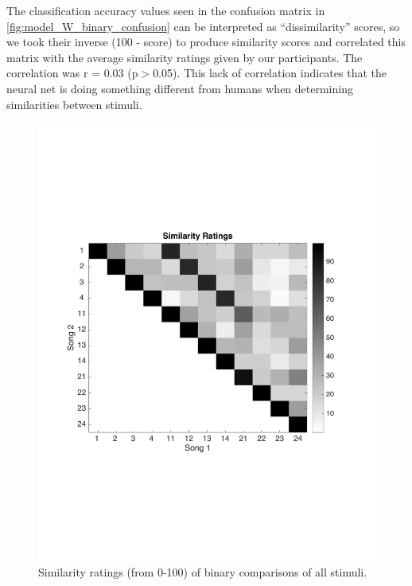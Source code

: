 The classification accuracy values seen in the confusion matrix in \autoref{fig:model_W_binary_confusion} can be interpreted as ``dissimilarity'' scores, so we took their inverse (100 - score) to produce similarity scores and correlated this matrix with the average similarity ratings given by our participants.
The correlation was r = 0.03 (p$>$0.05).
This lack of correlation indicates that the neural net is doing something different from humans when determining similarities between stimuli. 
\begin{figure}[htb] 
  \begin{center}
    \includegraphics[scale=0.6]{Figures/Similarity}
    \caption{Similarity ratings (from 0-100) of binary comparisons of all stimuli.}
    \label{fig:Similarity}
  \end{center}
\end{figure}